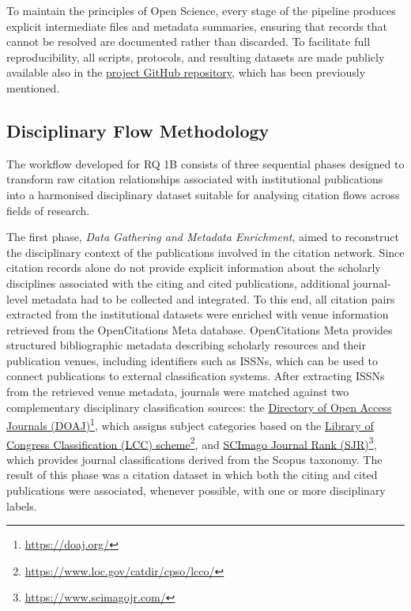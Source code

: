 \documentclass[year=2026]{cup-journal}
\begin{document}
To maintain the principles of Open Science, every stage of the pipeline produces explicit intermediate files and metadata summaries, ensuring that records that cannot be resolved are documented rather than discarded. To facilitate full reproducibility, all scripts, protocols, and resulting datasets are made publicly available also in the \href{https://github.com/open-sci/2025-2026/tree/main}{project GitHub repository}, which has been previously mentioned.

\subsection{Disciplinary Flow Methodology}

The workflow developed for RQ 1B consists of three sequential phases designed to transform raw citation relationships associated with institutional publications into a harmonised disciplinary dataset suitable for analysing citation flows across fields of research.

The first phase, \textit{Data Gathering and Metadata Enrichment}, aimed to reconstruct the disciplinary context of the publications involved in the citation network. Since citation records alone do not provide explicit information about the scholarly disciplines associated with the citing and cited publications, additional journal-level metadata had to be collected and integrated. To this end, all citation pairs extracted from the institutional datasets were enriched with venue information retrieved from the OpenCitations Meta database. OpenCitations Meta provides structured bibliographic metadata describing scholarly resources and their publication venues, including identifiers such as ISSNs, which can be used to connect publications to external classification systems. After extracting ISSNs from the retrieved venue metadata, journals were matched against two complementary disciplinary classification sources: the \href{https://doaj.org/}{Directory of Open Access Journals (DOAJ)}\footnote{\url{https://doaj.org/}}, which assigns subject categories based on the \href{https://www.loc.gov/catdir/cpso/lcco/}{Library of Congress Classification (LCC) scheme}\footnote{\url{https://www.loc.gov/catdir/cpso/lcco/}}, and \href{https://www.scimagojr.com/}{SCImago Journal Rank (SJR)}\footnote{\url{https://www.scimagojr.com/}}, which provides journal classifications derived from the Scopus taxonomy. The result of this phase was a citation dataset in which both the citing and cited publications were associated, whenever possible, with one or more disciplinary labels.
\end{document}
